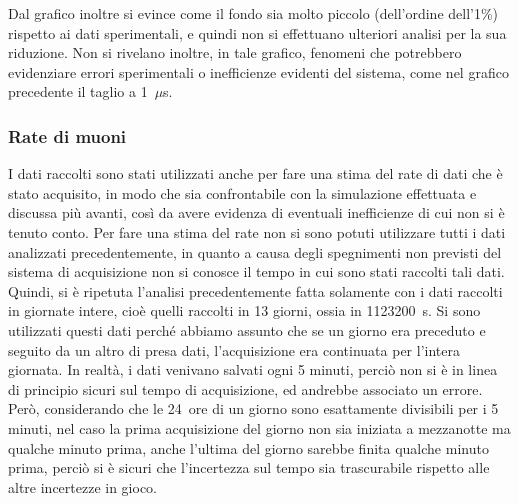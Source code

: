 Dal grafico inoltre si evince come il fondo sia molto piccolo (dell'ordine dell'1\%) rispetto ai dati sperimentali, e quindi non si effettuano ulteriori analisi per la sua riduzione. Non si rivelano inoltre, in tale grafico, fenomeni che potrebbero evidenziare errori sperimentali o inefficienze evidenti del sistema, come nel grafico precedente il taglio a 1~$\mu$s.

\subsubsection{Rate di muoni}
I dati raccolti sono stati utilizzati anche per fare una stima del rate di dati che è stato acquisito, in modo che sia confrontabile con la simulazione effettuata e discussa più avanti, così da avere evidenza di eventuali inefficienze di cui non si è tenuto conto. Per fare una stima del rate non si sono potuti utilizzare tutti i dati analizzati precedentemente, in quanto a causa degli spegnimenti non previsti del sistema di acquisizione non si conosce il tempo in cui sono stati raccolti tali dati.\\

Quindi, si è ripetuta l'analisi precedentemente fatta solamente con i dati raccolti in giornate intere, cioè quelli raccolti in 13 giorni, ossia in 1123200~s. Si sono utilizzati questi dati perch\'e abbiamo assunto che se un giorno era preceduto e seguito da un altro di presa dati, l'acquisizione era continuata per l'intera giornata. In realtà, i dati venivano salvati ogni 5 minuti, perciò non si è in linea di principio sicuri sul tempo di acquisizione, ed andrebbe associato un errore. Però, considerando che le 24~ore di un giorno sono esattamente divisibili per i 5 minuti, nel caso la prima acquisizione del giorno non sia iniziata a mezzanotte ma qualche minuto prima, anche l'ultima del giorno sarebbe finita qualche minuto prima, perciò si è sicuri che l'incertezza sul tempo sia trascurabile rispetto alle altre incertezze in gioco.\\

